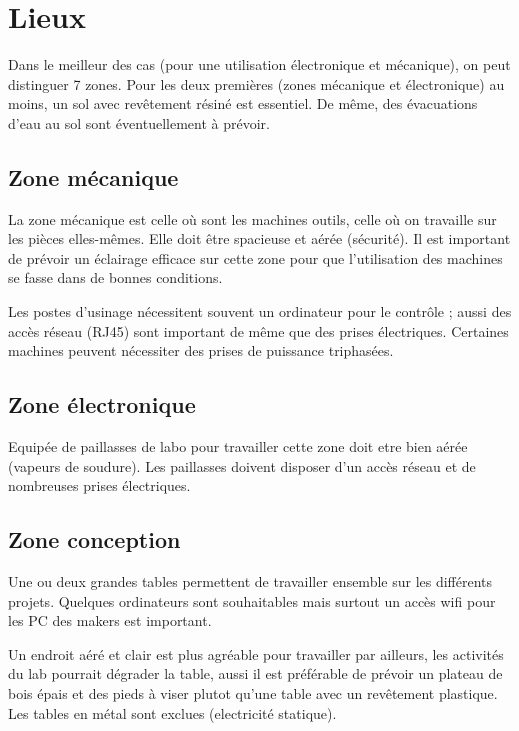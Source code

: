 \section{Lieux}

Dans le meilleur des cas (pour une utilisation électronique et mécanique), on peut distinguer 7 zones. Pour les deux
premières (zones mécanique et électronique) au moins, un sol avec revêtement résiné est essentiel. De même, des
évacuations d'eau au sol sont éventuellement à prévoir.

\subsection{Zone mécanique}

La zone mécanique est celle où sont les machines outils, celle où on travaille sur les pièces elles-mêmes. Elle doit
être spacieuse et aérée (sécurité). Il est important de prévoir un éclairage efficace sur cette zone pour que
l'utilisation des machines se fasse dans de bonnes conditions.

Les postes d'usinage nécessitent souvent un ordinateur pour le contrôle ; aussi  des accès réseau (RJ45) sont important
de même que des prises électriques. Certaines machines peuvent nécessiter des prises de puissance triphasées.

\subsection{Zone électronique}

Equipée de paillasses de labo pour travailler cette zone doit etre bien aérée (vapeurs de soudure). Les paillasses
doivent disposer d'un accès réseau et de nombreuses prises électriques.

\subsection{Zone conception}

Une ou deux grandes tables permettent de travailler ensemble sur les différents projets. Quelques ordinateurs sont
souhaitables mais surtout un accès wifi pour les PC des makers est important.

Un endroit aéré et clair est plus agréable pour travailler par ailleurs, les activités du lab pourrait dégrader la
table, aussi il est préférable de prévoir un plateau de bois épais et des pieds à viser plutot qu'une table avec un
revêtement plastique. Les tables en métal sont exclues (electricité statique).

